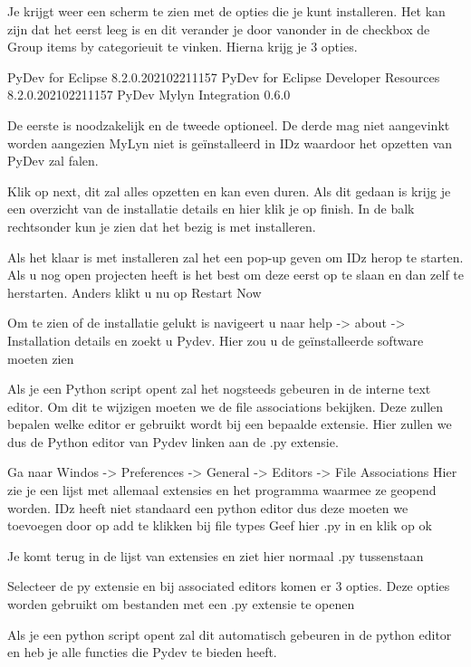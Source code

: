 Je krijgt weer een scherm te zien met de opties die je kunt installeren. Het kan zijn dat het eerst leeg is en dit verander je door vanonder in de checkbox de Group items by categorieuit te vinken. Hierna krijg je 3 opties.

PyDev for Eclipse 8.2.0.202102211157
PyDev for Eclipse Developer Resources 8.2.0.202102211157
PyDev Mylyn Integration 0.6.0

De eerste is noodzakelijk en de tweede optioneel. De derde mag niet aangevinkt worden aangezien MyLyn niet is geïnstalleerd in IDz waardoor het opzetten van PyDev zal falen.

Klik op next, dit zal alles opzetten en kan even duren. Als dit gedaan is krijg je een overzicht van de installatie details en hier klik je op finish. In de balk rechtsonder kun je zien dat het bezig is met installeren.

Als het klaar is met installeren zal het een pop-up geven om IDz herop te starten. Als u nog open projecten heeft is het best om deze eerst op te slaan en dan zelf te herstarten. Anders klikt u nu op Restart Now

Om te zien of de installatie gelukt is navigeert u naar help -> about -> Installation details en zoekt u Pydev.
Hier zou u de geïnstalleerde software moeten zien


Als je een Python script opent zal het nogsteeds gebeuren in de interne text editor. Om dit te wijzigen moeten we de file associations bekijken. Deze zullen bepalen welke editor er gebruikt wordt bij een bepaalde extensie. Hier zullen we dus de Python editor van Pydev linken aan de .py extensie.

Ga naar Windos -> Preferences -> General -> Editors -> File Associations
Hier zie je een lijst met allemaal extensies en het programma waarmee ze geopend worden. IDz heeft niet standaard een python editor dus deze moeten we toevoegen door op add te klikken bij file types
Geef hier .py in en klik op ok

Je komt terug in de lijst van extensies en ziet hier normaal .py tussenstaan

Selecteer de py extensie en bij associated editors komen er 3 opties.
Deze opties worden gebruikt om bestanden met een .py extensie te openen


Als je een python script opent zal dit automatisch gebeuren in de python editor en heb je alle functies die Pydev te bieden heeft.



